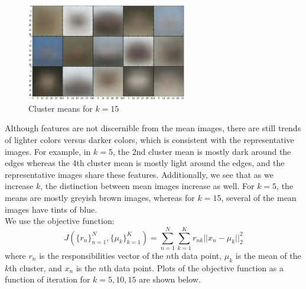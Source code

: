 \documentclass[11pt]{amsart}
\begin{document}
\begin{figure}
\centering
\includegraphics[width=7cm]{images/k15us.png}
\caption{Cluster means for $k=15$}
\end{figure}

Although features are not discernible from the mean images, there are still trends of lighter colors versus darker colors, which is consistent with the representative images. For example, in $k=5$, the 2nd cluster mean is mostly dark around the edges whereas the 4th cluster mean is mostly light around the edges, and the representative images share these features. Additionally, we see that as we increase $k$, the distinction between mean images increase as well. For $k=5$, the means are mostly greyish brown images, whereas for $k=15$, several of the mean images have tints of blue.\\

We use the objective function:
$$J(\{r_n\}^N_{n=1},\{\mu_k\}^K_{k=1})=\sum^N_{n=1}\sum^K_{k=1}r_{nk}||x_n-\mu_k||^2_2$$
where $r_n$ is the responsibilities vector of the $n$th data point, $\mu_k$ is the mean of the $k$th cluster, and $x_n$ is the $n$th data point. Plots of the objective function as a function of iteration for $k=5,10,15$ are shown below.
\end{document}
